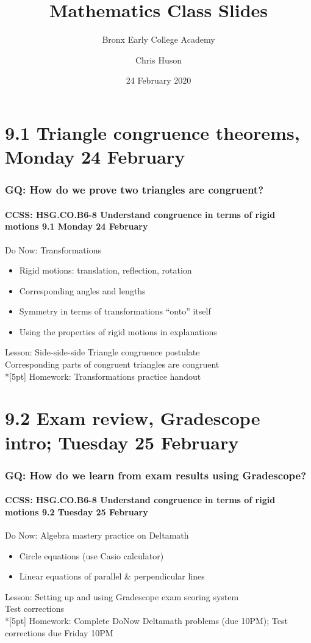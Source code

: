 \documentclass{beamer}
\title{Mathematics Class Slides}
\subtitle{Bronx Early College Academy}
\author{Chris Huson}
\date{24 February 2020}
\begin{document}
\frame{\titlepage}
\section[Outline]{}
\frame{\tableofcontents}

\section{9.1 Triangle congruence theorems, Monday 24 February} 
\frame
{
  \frametitle{GQ: How do we prove two triangles are congruent?}
  \framesubtitle{CCSS: HSG.CO.B6-8 Understand congruence in terms of rigid motions \hfill \alert{9.1 Monday 24 February}}

  \begin{block}{Do Now: Transformations}
  \begin{itemize}
    \item Rigid motions: translation, reflection, rotation
    \item Corresponding angles and lengths
    \item Symmetry in terms of transformations ``onto'' itself
    \item Using the properties of rigid motions in explanations
  \end{itemize}
  \end{block}
  Lesson: Side-side-side Triangle congruence postulate \\
  Corresponding parts of congruent triangles are congruent\\*[5pt]
  Homework: Transformations practice handout
}

\section{9.2 Exam review, Gradescope intro; Tuesday 25 February} 
\frame
{
  \frametitle{GQ: How do we learn from exam results using Gradescope?}
  \framesubtitle{CCSS: HSG.CO.B6-8 Understand congruence in terms of rigid motions \hfill \alert{9.2 Tuesday 25 February}}

  \begin{block}{Do Now: Algebra mastery practice on Deltamath}
    \begin{itemize}
      \item Circle equations (use Casio calculator)
      \item Linear equations of parallel \& perpendicular lines
    \end{itemize}
    \end{block}
    Lesson: Setting up and using Gradescope exam scoring system \\
    Test corrections\\*[5pt]
    Homework: Complete DoNow Deltamath problems (due 10PM); Test corrections due Friday 10PM
}
\end{document}

